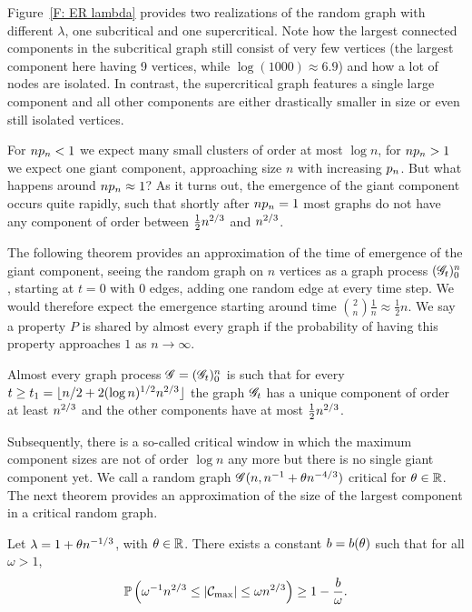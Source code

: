Figure~\ref{F: ER lambda} provides two realizations of the random graph with different $\lambda$,
one sub\-critical and one supercritical.
Note how the largest connected components in the sub\-critical graph still con\-sist of very few vertices
(the largest component here having 9 vertices, while $\log(1000) \approx 6.9$)
and how a lot of nodes are isolated.
In contrast, the supercritical graph features a single large component 
and all other components are either drastically smaller in size or even still isolated vertices.

\bigskip

For $n p_n < 1$ we expect many small clusters of order at most $\log n$,
for $n p_n > 1$ we expect one giant component, approaching size $n$ with increasing $p_n$.
But what happens around $n p_n \approx 1$?
As it turns out, the emergence of the giant component occurs quite rapidly,
such that shortly after $n p_n = 1$ most graphs do not have any component of order between $\frac{1}{2}n^{2 / 3}$ and $n^{2 / 3}$.

The following theorem provides an approximation of the time of emergence of the giant component,
seeing the random graph on $n$ vertices as a graph process $(\mathscr{G}_t)_0^n$,
starting at $t=0$ with $0$ edges, adding one random edge at every time step.
We would therefore expect the emergence starting around time $\binom{2}{n}\frac{1}{n} \approx \frac{1}{2}n$.
We say a property $P$ is shared by almost every graph if the probability of having this property approaches $1$ as $n \rightarrow \infty$. \label{I: point conv}

\begin{theorem}
	Almost every graph process
	$\mathscr{G} = (\mathscr{G}_t)_0^n$ is such that 
	for every $t \geq t_1 = \lfloor n/2 + 2(\log n)^{1/2}n^{2 / 3} \rfloor$ 
	the graph $\mathscr{G}_t$ has a unique component of order at least $n^{2 / 3}$ and the other components have at most $\frac{1}{2}n^{2 / 3}$.
\end{theorem}

Subsequently, there is a so-called critical window in which the maximum component sizes are not of order $\log n$ any more 
but there is no single giant component yet.
We call a random graph $\mathscr{G}(n, n^{-1} + \theta n^{-4 / 3})$ critical for $\theta \in \mathbb{R}$.\label{I: pp}
The next theorem provides an approximation of the size of the largest component in a critical random graph.

\begin{theorem} \label{T: largest critical cluster}
	Let $\lambda = 1 + \theta n^{-1 / 3}$, with $\theta \in \mathbb{R}$.
	There exists a constant $b = b(\theta)$ such that for all $\omega > 1$,
	\begin{equation*}
		\mathbb{P}\left( \omega^{-1} n^{2 / 3} \leq |\mathcal{C}_{\max}| \leq \omega n^{2 / 3}\right) \geq 1 - \frac{b}{\omega}.
	\end{equation*}	
\end{theorem}

